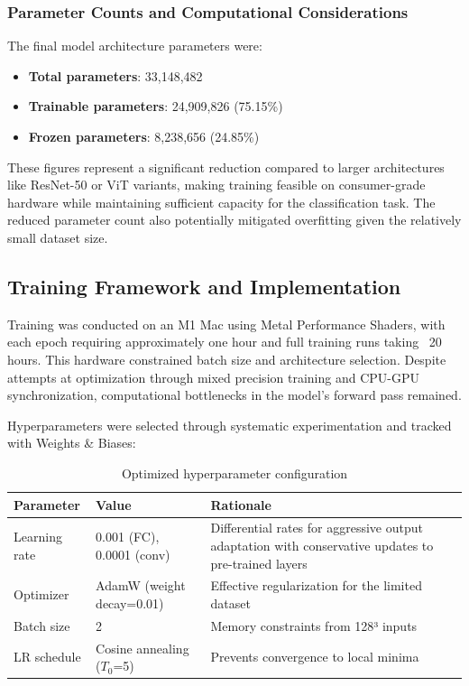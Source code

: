 \documentclass[12pt, a4paper]{article}
\begin{document}
\subsubsection{Parameter Counts and Computational Considerations}

The final model architecture parameters were:

\begin{itemize}
    \item \textbf{Total parameters}: 33,148,482
    \item \textbf{Trainable parameters}: 24,909,826 (75.15\%)
    \item \textbf{Frozen parameters}: 8,238,656 (24.85\%)
\end{itemize}

These figures represent a significant reduction compared to larger architectures like ResNet-50 or ViT variants, making training feasible on consumer-grade hardware while maintaining sufficient capacity for the classification task. The reduced parameter count also potentially mitigated overfitting given the relatively small dataset size.

\subsection{Training Framework and Implementation}

Training was conducted on an M1 Mac using Metal Performance Shaders, with each epoch requiring approximately one hour and full training runs taking ~20 hours. This hardware constrained batch size and architecture selection. Despite attempts at optimization through mixed precision training and CPU-GPU synchronization, computational bottlenecks in the model's forward pass remained.

Hyperparameters were selected through systematic experimentation and tracked with Weights \& Biases:

\begin{table}[h]
\centering
\begin{tabular}{|l|l|p{5.5cm}|}
\hline
\textbf{Parameter} & \textbf{Value} & \textbf{Rationale} \\
\hline
Learning rate & 0.001 (FC), 0.0001 (conv) & Differential rates for aggressive output adaptation with conservative updates to pre-trained layers \\
\hline
Optimizer & AdamW (weight decay=0.01) & Effective regularization for the limited dataset \\
\hline
Batch size & 2 & Memory constraints from 128³ inputs \\
\hline
LR schedule & Cosine annealing ($T_0$=5) & Prevents convergence to local minima \\
\hline
\end{tabular}
\caption{Optimized hyperparameter configuration}
\end{table}
\end{document}
